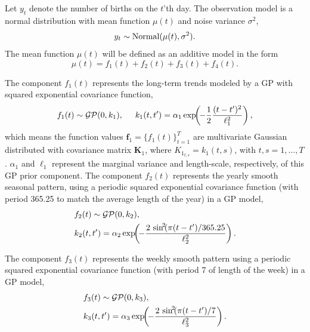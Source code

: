 Let $y_t$ denote the number of births on the $t$'th day. The observation model is a normal distribution with mean function $\mu(t)$ and noise variance $\sigma^2$,
%
\begin{equation*}
y_{t} \sim \operatorname{Normal}(\mu(t),\sigma^2).
\end{equation*}
%
The mean function $\mu(t)$ will be defined as an additive model in the form
%
\begin{equation} \label{eq_mean_brithday}
\mu(t) = f_1(t) + f_2(t) + f_3(t) + f_4(t).
\end{equation}

The component $f_1(t)$ represents the long-term trends modeled by a GP with squared exponential covariance function,
%
\begin{equation*}
f_1(t) \sim \operatorname{\mathcal{GP}}(0,k_1), \hspace{5mm} k_1(t,t') = \alpha_1 \exp\!\!\left(\!-\frac{1}{2} \frac{(t-t')^2}{\ell_1^2}\right), 
\end{equation*}
%
which means the function values $\bm{f}_1=\{f_1(t)\}_{t=1}^T$ are multivariate Gaussian distributed with covariance matrix $\bm{K}_1$, where $K_{1_{t,s}}=k_1(t,s)$, with $t,s=1,\dots,T$. $\alpha_1$ and $\ell_1$ represent the marginal variance and length-scale, respectively, of this GP prior component. 
The component $f_2(t)$ represents the yearly smooth seasonal pattern, using a periodic squared exponential covariance function (with period 365.25 to match the average length of the year) in a GP model,
%
\begin{align*}
&f_2(t) \sim \operatorname{\mathcal{GP}}(0,k_2), \\
&k_2(t,t') = \alpha_2 \exp\!\!\left(\!-\frac{2\,\sin^{\!2}\!(\pi(t-t')/365.25}{\ell_2^2}\right).
\end{align*}

The component $f_3(t)$ represents the weekly smooth pattern using a periodic squared exponential covariance function (with period 7 of length of the week) in a GP model,
%
\begin{align*}
&f_3(t) \sim \operatorname{\mathcal{GP}}(0,k_3), \\
&k_3(t,t') = \alpha_3 \exp\!\!\left(\!-\frac{2\,\sin^{\!2}\!(\pi(t-t')/7}{\ell_3^2}\right). 
\end{align*}


